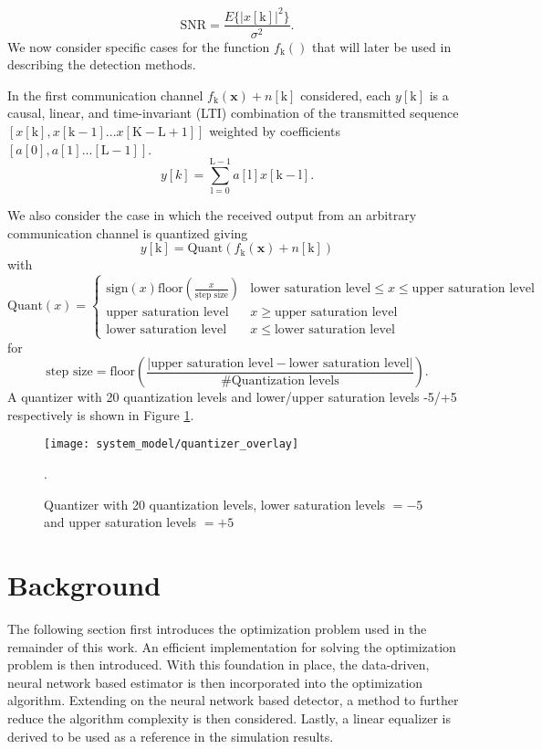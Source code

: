 \begin{equation*}
\text{SNR} = \frac{E\{|x[\text{k}]|^2\}}{\sigma^2}.
\end{equation*}
	We now consider specific cases for the function $f_{\text{k}}()$ that will later be used in describing the detection methods. 
	\par
In the first communication channel $f_{\text{k}}(\mathbf{x}) + n[\text{k}]$ considered, each $y[\text{k}]$ is a causal, linear, and time-invariant (LTI) combination of the transmitted sequence $[x[\text{k}], x[\text{k}-1]... x[\text{K}-\text{L}+1]]$ weighted by coefficients $[a[0], a[1].. . [\text{L}-1]]$. 
\begin{equation}\label{lti_channel}
y[k] = \sum_{\mathrm{\text{l}=0}}^{\mathrm{\text{L}-1}} a[\text{l}]x[\text{k}-\text{l}].
\end{equation}
\par 
We also consider the case in which the received output from an arbitrary communication channel is quantized giving
\begin{equation}\label{lti_quantized_channel}
y[\text{k}] = \text{Quant}(f_{\text{k}}(\mathbf{x}) + n[\text{k}])
\end{equation}
 with
\[\text{Quant}(x) = 
\begin{cases}
\text{sign}(x)\text{floor}(\frac{x}{\text{step size}})& \text{lower saturation level} \leq x \leq \text{upper saturation level}\\
\text{upper saturation level} & x \geq \text{upper saturation level}\\
\text{lower saturation level} & x \leq \text{lower saturation level}
\end{cases}
\]
 for 
 \begin{equation*}
  \text{step size} =\text{floor}\left(\frac{|\text{upper saturation level}- \text{lower saturation level}|}{\text{\# Quantization levels}}\right).
 \end{equation*} A quantizer with 20 quantization levels and lower/upper saturation levels -5/+5 respectively is shown in Figure \ref{fig:Quantized Overlay}.
 
 \begin{figure}[H]
\centering
	\texttt{[image: system\_model/quantizer\_overlay]}
			  \caption{Quantizer with 20 quantization levels, lower saturation levels  $= -5$ and upper saturation levels  $= +5$}.
	  \label{fig:Quantized Overlay}
\end{figure}
 
\section{Background}
The following section first introduces the optimization problem used in the remainder of this work. An efficient implementation for solving the optimization problem is then introduced. With this foundation in place, the data-driven, neural network based estimator is then incorporated into the optimization algorithm. 
Extending on the neural network based detector, a method to further reduce the algorithm complexity is then considered. Lastly, a linear equalizer is derived to be used as a reference in the simulation results. 
